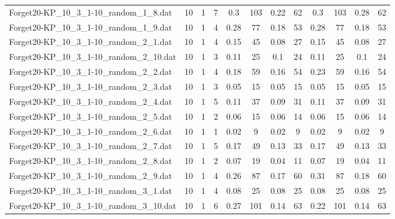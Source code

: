 \begin{sidewaystable}[!ht]
{\begin{tabular}{lccccccccccc}
Forget20-KP\_10\_3\_1-10\_random\_1\_8.dat & 10 & 1 & 7 & 0.3 & 103 &  \textcolor{blue2}{0.22} & 62 & 0.3 & 103 & 0.28 & 62 \\
Forget20-KP\_10\_3\_1-10\_random\_1\_9.dat & 10 & 1 & 4 & 0.28 & 77 &  \textcolor{blue2}{0.18} & 53 & 0.28 & 77 &  \textcolor{blue2}{0.18} & 53 \\
Forget20-KP\_10\_3\_1-10\_random\_2\_1.dat & 10 & 1 & 4 & 0.15 & 45 &  \textcolor{blue2}{0.08} & 27 & 0.15 & 45 &  \textcolor{blue2}{0.08} & 27 \\
Forget20-KP\_10\_3\_1-10\_random\_2\_10.dat & 10 & 1 & 3 & 0.11 & 25 &  \textcolor{blue2}{0.1} & 24 & 0.11 & 25 &  \textcolor{blue2}{0.1} & 24 \\
Forget20-KP\_10\_3\_1-10\_random\_2\_2.dat & 10 & 1 & 4 & 0.18 & 59 &  \textcolor{blue2}{0.16} & 54 & 0.23 & 59 &  \textcolor{blue2}{0.16} & 54 \\
Forget20-KP\_10\_3\_1-10\_random\_2\_3.dat & 10 & 1 & 3 &  \textcolor{blue2}{0.05} & 15 &  \textcolor{blue2}{0.05} & 15 &  \textcolor{blue2}{0.05} & 15 &  \textcolor{blue2}{0.05} & 15 \\
Forget20-KP\_10\_3\_1-10\_random\_2\_4.dat & 10 & 1 & 5 & 0.11 & 37 &  \textcolor{blue2}{0.09} & 31 & 0.11 & 37 &  \textcolor{blue2}{0.09} & 31 \\
Forget20-KP\_10\_3\_1-10\_random\_2\_5.dat & 10 & 1 & 2 &  \textcolor{blue2}{0.06} & 15 &  \textcolor{blue2}{0.06} & 14 &  \textcolor{blue2}{0.06} & 15 &  \textcolor{blue2}{0.06} & 14 \\
Forget20-KP\_10\_3\_1-10\_random\_2\_6.dat & 10 & 1 & 1 &  \textcolor{blue2}{0.02} & 9 &  \textcolor{blue2}{0.02} & 9 &  \textcolor{blue2}{0.02} & 9 &  \textcolor{blue2}{0.02} & 9 \\
Forget20-KP\_10\_3\_1-10\_random\_2\_7.dat & 10 & 1 & 5 & 0.17 & 49 &  \textcolor{blue2}{0.13} & 33 & 0.17 & 49 &  \textcolor{blue2}{0.13} & 33 \\
Forget20-KP\_10\_3\_1-10\_random\_2\_8.dat & 10 & 1 & 2 & 0.07 & 19 &  \textcolor{blue2}{0.04} & 11 & 0.07 & 19 &  \textcolor{blue2}{0.04} & 11 \\
Forget20-KP\_10\_3\_1-10\_random\_2\_9.dat & 10 & 1 & 4 & 0.26 & 87 &  \textcolor{blue2}{0.17} & 60 & 0.31 & 87 & 0.18 & 60 \\
Forget20-KP\_10\_3\_1-10\_random\_3\_1.dat & 10 & 1 & 4 &  \textcolor{blue2}{0.08} & 25 &  \textcolor{blue2}{0.08} & 25 &  \textcolor{blue2}{0.08} & 25 &  \textcolor{blue2}{0.08} & 25 \\
Forget20-KP\_10\_3\_1-10\_random\_3\_10.dat & 10 & 1 & 6 & 0.27 & 101 &  \textcolor{blue2}{0.14} & 63 & 0.22 & 101 &  \textcolor{blue2}{0.14} & 63 \\

\end{tabular}}
\end{sidewaystable}
